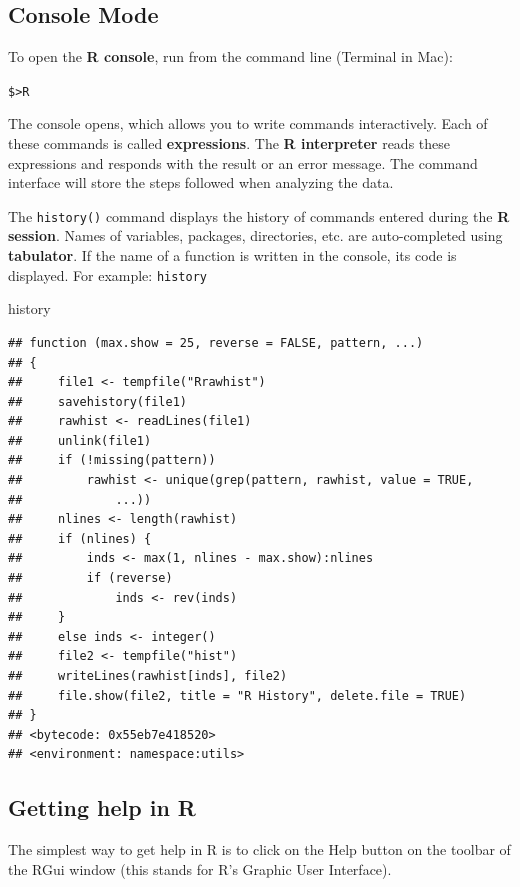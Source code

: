 \documentclass[
]{book}
\newenvironment{Shaded}{\begin{snugshade}}{\end{snugshade}}
\newcommand{\NormalTok}[1]{#1}
\begin{document}
\hypertarget{console-mode}{%
\subsection{Console Mode}\label{console-mode}}

To open the \textbf{R console}, run from the command line (Terminal in Mac):

\texttt{\$\textgreater{}R}

The console opens, which allows you to write commands interactively. Each of these commands is called \textbf{expressions}. The \textbf{R interpreter} reads these expressions and responds with the result or an error message. The command interface will store the steps followed when analyzing the data.

The \texttt{history()} command displays the history of commands entered during the \textbf{R session}. Names of variables, packages, directories, etc. are auto-completed using \textbf{tabulator}. If the name of a function is written in the console, its code is displayed. For example: \texttt{history}

\begin{Shaded}
\begin{Highlighting}[]
\NormalTok{history}
\end{Highlighting}
\end{Shaded}

\begin{verbatim}
## function (max.show = 25, reverse = FALSE, pattern, ...) 
## {
##     file1 <- tempfile("Rrawhist")
##     savehistory(file1)
##     rawhist <- readLines(file1)
##     unlink(file1)
##     if (!missing(pattern)) 
##         rawhist <- unique(grep(pattern, rawhist, value = TRUE, 
##             ...))
##     nlines <- length(rawhist)
##     if (nlines) {
##         inds <- max(1, nlines - max.show):nlines
##         if (reverse) 
##             inds <- rev(inds)
##     }
##     else inds <- integer()
##     file2 <- tempfile("hist")
##     writeLines(rawhist[inds], file2)
##     file.show(file2, title = "R History", delete.file = TRUE)
## }
## <bytecode: 0x55eb7e418520>
## <environment: namespace:utils>
\end{verbatim}

\hypertarget{getting-help-in-r}{%
\subsection{Getting help in R}\label{getting-help-in-r}}

The simplest way to get help in R is to click on the Help button on the toolbar of the RGui window (this stands for R's Graphic User Interface).
\end{document}
